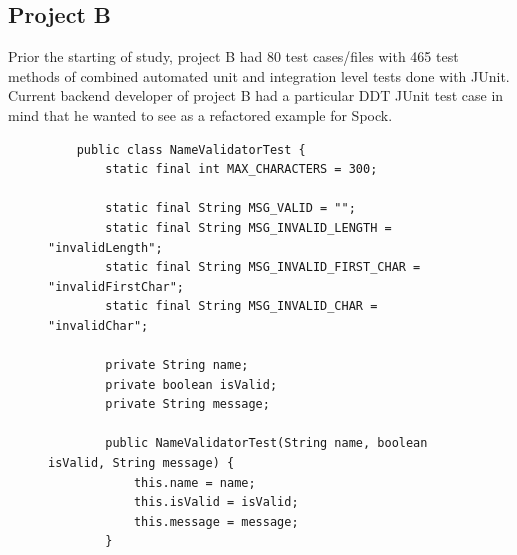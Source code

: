     \subsection{Project B}
    Prior the starting of study, project B had 80 test cases/files with 465 test methods of combined automated unit and integration level tests done with JUnit.
    Current backend developer of project B had a particular DDT JUnit test case in mind that he wanted to see as a refactored example
    for Spock.

    \begin{figure}[H]
        \begin{lstlisting}[style=javatiny]
    %%@RunWith%%(Parameterized.class)
    public class NameValidatorTest {
        static final int MAX_CHARACTERS = 300;

        static final String MSG_VALID = "";
        static final String MSG_INVALID_LENGTH = "invalidLength";
        static final String MSG_INVALID_FIRST_CHAR = "invalidFirstChar";
        static final String MSG_INVALID_CHAR = "invalidChar";

        private String name;
        private boolean isValid;
        private String message;

        public NameValidatorTest(String name, boolean isValid, String message) {
            this.name = name;
            this.isValid = isValid;
            this.message = message;
        }


\end{lstlisting}
\end{figure}
